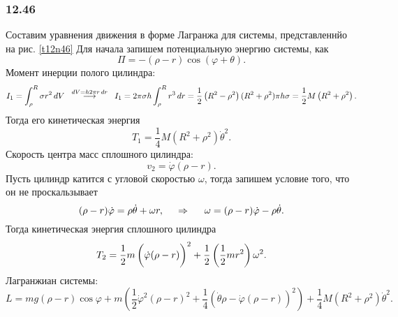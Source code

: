 \subsubsection*{12.46}

Составим уравнения движения в форме Лагранжа для системы, представленнйо на рис. \ref{t12n46} Для начала запишем потенциальную энергию системы, как
\begin{equation*}
    \Pi = - (\rho - r) \cos (\varphi  + \theta).
\end{equation*}
Момент инерции полого цилиндра:
\begin{equation*}
    I_1 = \int_\rho^R \sigma r^2 \, d V 
    \hspace{0.2cm} 
    \overset{dV = h 2 \pi r \, d r}{\longrightarrow} 
    \hspace{0.2cm} 
    I_1 = 2 \pi \sigma h \int_\rho^R r^3 \, d r = 
    \frac{1}{2} \left(R^2 - \rho^2  \right) (R^2 + \rho^2) \pi  h \sigma =
    \frac{1}{2} M \left(R^2 + \rho^2\right).
\end{equation*}
Тогда его кинетическая энергия 
\begin{equation*}
    T_1 = \frac{1}{4} M \left(R^2 + \rho^2\right) \dot{\theta}^2.
\end{equation*}
Скорость центра масс сплошного цилиндра:
\begin{equation*}
    v_2 = \dot{\varphi} (\rho  - r).
\end{equation*}
Пусть цилиндр катится с угловой скоростью $\omega$, тогда запишем условие того, что он не проскальзывает
\begin{equation*}
    (\rho - r) \dot{\varphi} = \rho \dot{\theta} + \omega r,
    \hspace{0.5cm} \Rightarrow \hspace{0.5cm} 
    \omega = (\rho - r) \dot{\varphi} - \rho \dot{\theta}.
\end{equation*}
Тогда кинетическая энергия сплошного цилиндра
\begin{equation*}
    T_2 = 
    \frac{1}{2} m \left(
        \dot{\varphi} (\rho - r) \vp
    \right)^2 + 
    \frac{1}{2} \left(\frac{1}{2} m r^2 \right) \omega^2
    .
\end{equation*}
Лагранжиан системы:
\begin{equation}
    L = 
    mg (\rho - r) \cos \varphi +
     m \left(
        \frac{1}{2}  \dot{\varphi}^2 (\rho - r)^2 + 
        \frac{1}{4} \left(
            \dot{\theta} \rho - \dot{\varphi} (\rho - r)
        \right)^2
    \right) + \frac{1}{4} M \left(R^2  + \rho^2\right)\dot{\theta}^2.
\end{equation}
